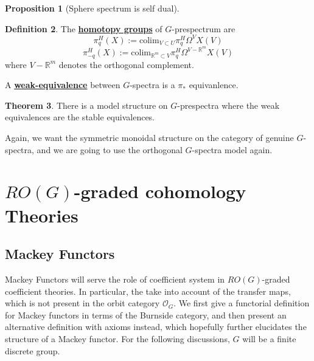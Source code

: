 \documentclass{article}
\theoremstyle{definition}
\newtheorem{theorem}{Theorem}[section] %
\newtheorem{definition}[theorem]{Definition}
\newtheorem{proposition}[theorem]{Proposition}
\begin{document}
\begin{tcolorbox}[colback=blue!5!white,colframe=blue!30!white]
\begin{proposition}[Sphere spectrum is self dual]

\end{proposition}
\end{tcolorbox}





\begin{tcolorbox}[colback=purple!5!white,colframe=purple!75!black]
\begin{definition}
The \underline{\textbf{homotopy groups}} of $G$-prespectrum are 
\[\pi_q^H(X):=\textrm{colim}_{V\subset U}\pi_q^H\Omega^VX(V)\]
\[\pi_{-q}^H(X):=\textrm{colim}_{\mathbb{R}^m\subset V}\pi_q^H\Omega^{V-\mathbb{R}^m}X(V)\]
where $V-\mathbb{R}^m$ denotes the orthogonal complement. 

A \underline{\textbf{weak-equivalence}} between $G$-spectra is a $\pi_*$ equivanlence. 
\end{definition}
\end{tcolorbox}


\begin{tcolorbox}[colback=red!5!white,colframe=red!30!white]
\begin{theorem}
There is a model structure on $G$-prespectra where the weak equivalences are the stable equivalences. 
\end{theorem}
\end{tcolorbox}
Again, we want the symmetric monoidal structure on the category of genuine $G$-spectra, and we are going to use the orthogonal $G$-spectra model again. 


\section{$RO(G)$-graded cohomology Theories}
\subsection{Mackey Functors}
Mackey Functors will serve the role of coefficient system in $RO(G)$-graded coefficient theories. In particular, the take into account of the transfer maps, which is not present in the orbit category $\mathcal{O}_G$. We first give a functorial definition for Mackey functors in terms of the Burnside category, and then present an alternative definition with axioms instead, which hopefully further elucidates the structure of a Mackey functor. For the following discussions, $G$ will be a finite discrete group.
\end{document}
